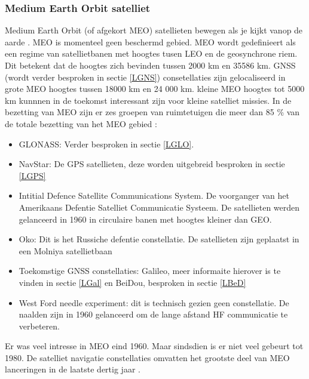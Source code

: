 \subsubsection{Medium Earth Orbit satelliet}
Medium Earth Orbit (of afgekort MEO) satellieten bewegen als je kijkt vanop de aarde \cite{LBibGEO}. MEO is momenteel geen beschermd gebied. MEO wordt gedefinieert als een regime van satellietbanen met hoogtes tusen LEO en de geosynchrone riem. Dit betekent dat de hoogtes zich bevinden tussen 2000 km en 35586 km.  GNSS (wordt verder besproken in sectie \ref{LGNS}) consetellaties zijn gelocaliseerd in grote MEO hoogtes tussen 18000 km en 24 000 km. kleine MEO hoogtes tot 5000 km kunnnen in de toekomst interessant zijn voor kleine satelliet missies. In de bezetting van MEO zijn er zes groepen van ruimtetuigen die meer dan 85 \% van de totale bezetting van het MEO gebied \cite{LBibMEO}:
\begin{itemize}
	\item GLONASS: Verder besproken in sectie \ref{LGLO}. 
	\item NavStar: De GPS satellieten, deze worden uitgebreid besproken in sectie \ref{LGPS}
	\item Intitial Defence Satellite Communications System. De voorganger van het Amerikaans Defentie Satelliet Communicatie Systeem. De satellieten werden gelanceerd in 1960 in circulaire banen met hoogtes kleiner dan GEO.
	\item  Oko: Dit is het Russiche defentie constellatie. De satellieten zijn geplaatst in een Molniya satellietbaan
	\item Toekomstige GNSS constellaties: Galileo, meer informaite hierover is te vinden in sectie \ref{LGal} en BeiDou, besproken in sectie \ref{LBeD}
	\item West Ford needle experiment: dit is technisch gezien geen constellatie. De naalden zijn in 1960 gelanceerd om de lange afstand HF communicatie te verbeteren. 
\end{itemize}
Er was veel intresse in MEO eind 1960. Maar sindsdien is er niet veel gebeurt tot 1980. De satelliet navigatie constellaties omvatten het grootste deel van MEO lanceringen in de laatste dertig jaar \cite{LBibMEO}.


